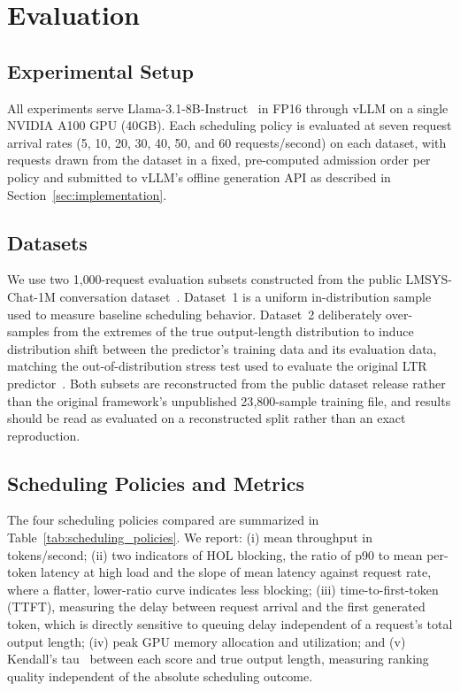 \section{Evaluation}
\label{sec:evaluation}

\subsection{Experimental Setup}
\label{subsec:setup}

All experiments serve Llama-3.1-8B-Instruct~\cite{dubey2024llama3} in FP16 through vLLM on a single
NVIDIA A100 GPU (40GB). Each scheduling policy is evaluated at seven request
arrival rates (5, 10, 20, 30, 40, 50, and 60 requests/second) on each dataset,
with requests drawn from the dataset in a fixed, pre-computed admission order
per policy and submitted to vLLM's offline generation API as described in
Section~\ref{sec:implementation}.

\subsection{Datasets}
\label{subsec:datasets}

We use two 1{,}000-request evaluation subsets constructed from the public
LMSYS-Chat-1M conversation dataset~\cite{zheng2023lmsyschat,lmsys2024website}. Dataset~1 is a
uniform in-distribution sample used to measure baseline scheduling behavior.
Dataset~2 deliberately over-samples from the extremes of the true
output-length distribution to induce distribution shift between the
predictor's training data and its evaluation data, matching the
out-of-distribution stress test used to evaluate the original LTR
predictor~\cite{fu2024efficient}. Both subsets are reconstructed from the
public dataset release rather than the original framework's unpublished
23{,}800-sample training file, and results should be read as evaluated on a
reconstructed split rather than an exact reproduction.

\subsection{Scheduling Policies and Metrics}
\label{subsec:policies-metrics}

The four scheduling policies compared are summarized in
Table~\ref{tab:scheduling_policies}. We report: (i) mean throughput in
tokens/second; (ii) two indicators of HOL blocking, the ratio of p90 to mean
per-token latency at high load and the slope of mean latency against request
rate, where a flatter, lower-ratio curve indicates less blocking; (iii)
time-to-first-token (TTFT), measuring the delay between request arrival and
the first generated token, which is directly sensitive to queuing delay
independent of a request's total output length; (iv) peak GPU memory
allocation and utilization; and (v) Kendall's tau~\cite{kendall1938new} between each score and true
output length, measuring ranking quality independent of the absolute
scheduling outcome.

